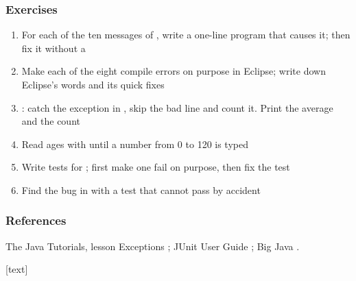 \documentclass[aspectratio=169,10pt,compress]{beamer}
\begin{document}
\begin{frame}[t,fragile] \frametitle{Exercises}
	\begin{enumerate}\small
		\item For each of the ten messages of , write a one-line program that causes it; then fix it without a 
		\item Make each of the eight compile errors on purpose in Eclipse; write down Eclipse's words and its quick fixes
		\item {}: catch the exception in , skip the bad line and count it. Print the average and the count
		\item Read ages with  until a number from 0 to 120 is typed
		\item Write  tests for ; first make one fail on purpose, then fix the test
		\item Find the bug in  with a test that cannot pass by accident
	\end{enumerate}
\end{frame}




\begin{frame}[t,fragile] \frametitle{References}
	\small The Java Tutorials, lesson Exceptions \cite{TheJavaTutorials}; JUnit User Guide \cite{homeJunit}; Big Java \cite{horstmann2016big}.

	\vspace{1em}
	[text]
	
	\tiny
\end{frame}




\begin{frame}[t,fragile]
	\begin{center}
		\vspace{4cm}
	\end{center}
\end{frame}
\end{document}
